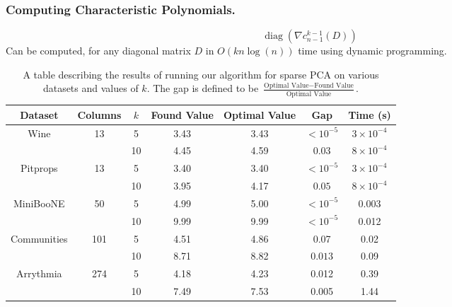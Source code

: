 \documentclass{beamer}
\DeclareMathOperator*{\diag}{diag}
\begin{document}
\begin{frame}
    \frametitle{Computing Characteristic Polynomials.}
    \[
        \diag(\nabla c_{n-1}^{k-1}(D))
    \]
    Can be computed, for any diagonal matrix $D$ in $O(kn\log(n))$ time using dynamic programming.
\end{frame}
\begin{frame}
    \tiny{
\begin{table}[H]
\begin{center}
    \begin{tabular}{c|c c c c c c}
        Dataset & Columns & $k$ & Found Value & Optimal Value & Gap & Time (s)\\
        \hline
        Wine & 13 & 5 & 3.43 & 3.43 & $<10^{-5}$ & $3\times 10^{-4}$\\
             &    & 10 & 4.45 & 4.59 & $0.03$ & $8\times 10^{-4}$\\
        \hline
        Pitprops & 13 & 5 & 3.40 & 3.40 & $<10^{-5}$ & $3\times 10^{-4}$\\
             &    & 10 & 3.95 & 4.17 & $0.05$ & $8\times 10^{-4}$\\
        \hline
        MiniBooNE & 50 & 5 & 4.99 & 5.00 & $<10^{-5}$ & 0.003\\
             &    & 10 & 9.99 & 9.99 & $<10^{-5}$ & 0.012\\
        \hline
        Communities & 101 & 5 & 4.51 & 4.86 & 0.07 & 0.02 \\
             &    & 10 & 8.71 & 8.82 & $0.013$ & 0.09\\
        \hline
        Arrythmia & 274 & 5 & 4.18 & 4.23 & 0.012 & 0.39\\
         & & 10 & 7.49 & 7.53 & 0.005 & 1.44
    \end{tabular}

\end{center}
\caption{A table describing the results of running our algorithm for sparse PCA on various datasets and values of $k$.  The gap is defined to be $\frac{\text{Optimal Value} - \text{Found Value}}{\text{Optimal Value}}$.}
\end{table}}
\end{frame}
\end{document}
